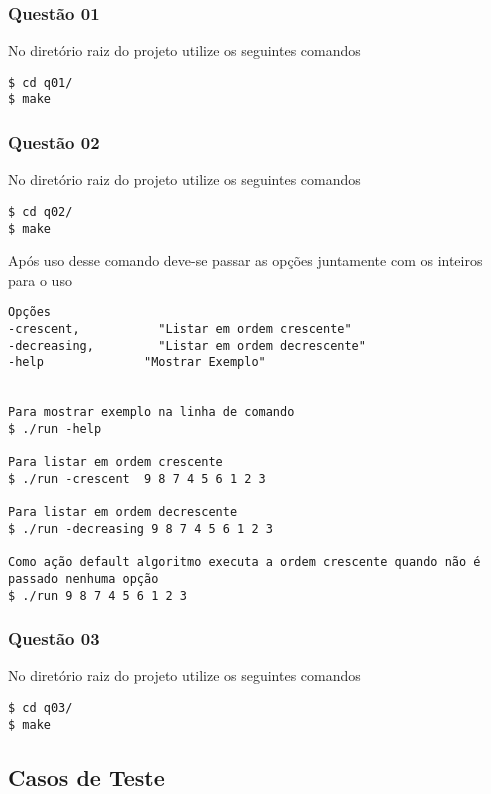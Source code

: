 \documentclass[11pt,a4paper]{article}
\begin{document}
\subsubsection{Questão 01}
No diretório raiz do projeto utilize os seguintes comandos
\begin{verbatim}
$ cd q01/
$ make
\end{verbatim}

\subsubsection{Questão 02}
No diretório raiz do projeto utilize os seguintes comandos
\begin{verbatim}
$ cd q02/
$ make
\end{verbatim}

Após uso desse comando deve-se passar as opções juntamente com os inteiros
para o uso

\begin{verbatim}
Opções
-crescent, 			 "Listar em ordem crescente"
-decreasing, 		 "Listar em ordem decrescente"
-help 		       "Mostrar Exemplo"


Para mostrar exemplo na linha de comando
$ ./run -help

Para listar em ordem crescente
$ ./run -crescent  9 8 7 4 5 6 1 2 3

Para listar em ordem decrescente
$ ./run -decreasing 9 8 7 4 5 6 1 2 3

Como ação default algoritmo executa a ordem crescente quando não é passado nenhuma opção
$ ./run 9 8 7 4 5 6 1 2 3

\end{verbatim}











\subsubsection{Questão 03}
No diretório raiz do projeto utilize os seguintes comandos
\begin{verbatim}
$ cd q03/
$ make
\end{verbatim}

\subsection{Casos de Teste}
\end{document}
